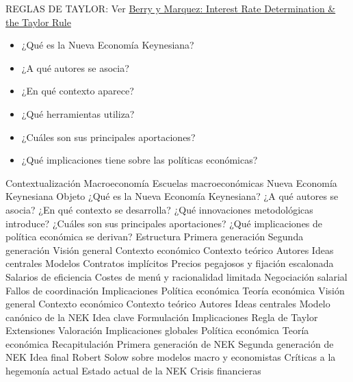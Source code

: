 \documentclass{nuevotema}
\begin{document}
\ideaclave


REGLAS DE TAYLOR: Ver \href{https://sais.jhu.edu/sites/default/files/Taylor%20Rule_Berry_Marquez.pdf}{Berry y Marquez: Interest Rate Determination \& the Taylor Rule}

\begin{itemize}
	\item ¿Qué es la Nueva Economía Keynesiana?
	\item ¿A qué autores se asocia?
	\item ¿En qué contexto aparece?
	\item ¿Qué herramientas utiliza?
	\item ¿Cuáles son sus principales aportaciones?
	\item ¿Qué implicaciones tiene sobre las políticas económicas?
\end{itemize}

\esquemacorto

\begin{esquema}[enumerate]
	\1[] 
		\2 Contextualización
			\3 Macroeconomía
			\3 Escuelas macroeconómicas
			\3 Nueva Economía Keynesiana
		\2 Objeto
			\3 ¿Qué es la Nueva Economía Keynesiana?
			\3 ¿A qué autores se asocia?
			\3 ¿En qué contexto se desarrolla?
			\3 ¿Qué innovaciones metodológicas introduce?
			\3 ¿Cuáles son sus principales aportaciones?
			\3 ¿Qué implicaciones de política económica se derivan?
		\2 Estructura
			\3 Primera generación
			\3 Segunda generación
	\1 
		\2 Visión general
			\3 Contexto económico
			\3 Contexto teórico
			\3 Autores
			\3 Ideas centrales
		\2 Modelos
			\3 Contratos implícitos
			\3 Precios pegajosos y fijación escalonada
			\3 Salarios de eficiencia
			\3 Costes de menú y racionalidad limitada
			\3 Negociación salarial
			\3 Fallos de coordinación
		\2 Implicaciones
			\3 Política económica
			\3 Teoría económica
	\1 
		\2 Visión general
			\3 Contexto económico
			\3 Contexto teórico
			\3 Autores
			\3 Ideas centrales
		\2 Modelo canónico de la NEK
			\3 Idea clave
			\3 Formulación
			\3 Implicaciones
			\3 Regla de Taylor
			\3 Extensiones
			\3 Valoración
		\2 Implicaciones globales
			\3 Política económica
			\3 Teoría económica
	\1[] 
		\2 Recapitulación
			\3 Primera generación de NEK
			\3 Segunda generación de NEK
		\2 Idea final
			\3 Robert Solow sobre modelos macro y economistas
			\3 Críticas a la hegemonía actual
			\3 Estado actual de la NEK
			\3 Crisis financieras

\end{esquema}
\end{document}
